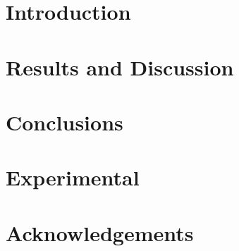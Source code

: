 \documentclass{rcclab}
\begin{document}
\section{Introduction}


\section{Results and Discussion}



\section{Conclusions}



\section{Experimental}


\section{Acknowledgements}



\clearpage
\printbibliography
\end{document}
